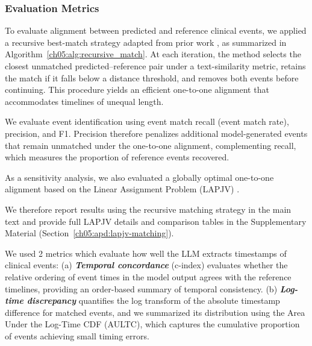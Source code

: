 \subsubsection{Evaluation Metrics}
\label{ch05:sec:evaluation-metrics}

\label{ch06:sec:evaluation_methodology_metrics}


To evaluate alignment between predicted and reference clinical events, we applied a recursive best-match strategy adapted from prior work \citep{wang2025large,pmlr-v333-noroozizadeh26a}, as summarized in Algorithm~\ref{ch05:alg:recursive_match}.
At each iteration, the method selects the closest unmatched predicted--reference pair under a text-similarity metric, retains the match if it falls below a distance threshold, and removes both events before continuing.
This procedure yields an efficient one-to-one alignment that accommodates timelines of unequal length.

We evaluate event identification using event match recall (event match rate), precision, and F1.
Precision therefore penalizes additional model-generated events that remain unmatched under the one-to-one alignment, complementing recall, which measures the proportion of reference events recovered.

As a sensitivity analysis, we also evaluated a globally optimal one-to-one alignment based on the Linear Assignment Problem (LAPJV) \citep{jonker1987shortest}.

We therefore report results using the recursive matching strategy in the main text and provide full LAPJV details and comparison tables in the Supplementary Material (Section~\ref{ch05:apd:lapjv-matching}).


We used 2 metrics which evaluate how well the LLM extracts timestamps of clinical events: (a) \textbf{\emph{Temporal concordance}} (c-index) evaluates whether the relative ordering of event times in the model output agrees with the reference timelines, providing an order-based summary of temporal consistency. (b) \textbf{\emph{Log-time discrepancy}} quantifies the log transform of the absolute timestamp difference for matched events, and we summarized its distribution using the Area Under the Log-Time CDF (AULTC), which captures the cumulative proportion of events achieving small timing errors. 


